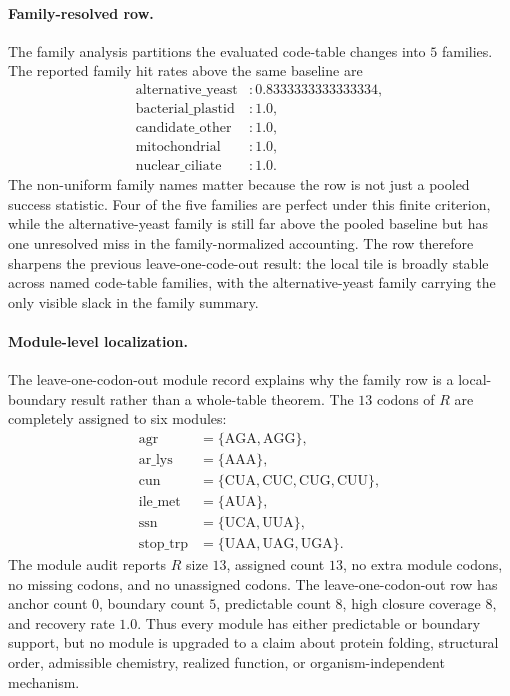 \paragraph{Family-resolved row.}
The family analysis partitions the evaluated code-table changes into $5$ families.  The reported family hit rates above the same baseline are
$$
\begin{aligned}
\mathrm{alternative\_yeast}&:0.8333333333333334,\\
\mathrm{bacterial\_plastid}&:1.0,\\
\mathrm{candidate\_other}&:1.0,\\
\mathrm{mitochondrial}&:1.0,\\
\mathrm{nuclear\_ciliate}&:1.0.
\end{aligned}
$$
The non-uniform family names matter because the row is not just a pooled success statistic.  Four of the five families are perfect under this finite criterion, while the alternative-yeast family is still far above the pooled baseline but has one unresolved miss in the family-normalized accounting.  The row therefore sharpens the previous leave-one-code-out result: the local tile is broadly stable across named code-table families, with the alternative-yeast family carrying the only visible slack in the family summary.

\paragraph{Module-level localization.}
The leave-one-codon-out module record explains why the family row is a local-boundary result rather than a whole-table theorem.  The $13$ codons of $R$ are completely assigned to six modules:
$$
\begin{aligned}
\mathrm{agr}&=\{\mathrm{AGA},\mathrm{AGG}\},\\
\mathrm{ar\_lys}&=\{\mathrm{AAA}\},\\
\mathrm{cun}&=\{\mathrm{CUA},\mathrm{CUC},\mathrm{CUG},\mathrm{CUU}\},\\
\mathrm{ile\_met}&=\{\mathrm{AUA}\},\\
\mathrm{ssn}&=\{\mathrm{UCA},\mathrm{UUA}\},\\
\mathrm{stop\_trp}&=\{\mathrm{UAA},\mathrm{UAG},\mathrm{UGA}\}.
\end{aligned}
$$
The module audit reports $R$ size $13$, assigned count $13$, no extra module codons, no missing codons, and no unassigned codons.  The leave-one-codon-out row has anchor count $0$, boundary count $5$, predictable count $8$, high closure coverage $8$, and recovery rate $1.0$.  Thus every module has either predictable or boundary support, but no module is upgraded to a claim about protein folding, structural order, admissible chemistry, realized function, or organism-independent mechanism.


